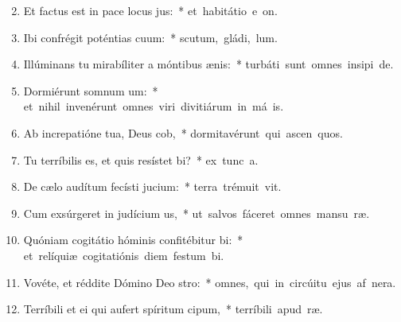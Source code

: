 \begin{flushleft}
\begin{enumerate}[leftmargin=*]
\setcounter{enumi}{1}


\item Et factus est in pace locus jus:~* \mbox{et habitátio e  on.}
\item Ibi confrégit poténtias cuum:~* \mbox{scutum, gládi,  lum.}
\item Illúminans tu mirabíliter a móntibus ænis:~* \mbox{turbáti sunt omnes insipi de.}
\item Dormiérunt somnum um:~* \mbox{et nihil invenérunt omnes viri divitiárum in má is.}
\item Ab increpatióne tua, Deus cob,~* \mbox{dormitavérunt qui ascen quos.}
\item Tu terríbilis es, et quis resístet bi?~* \mbox{ex tunc  a.}
\item De cælo audítum fecísti jucium:~* \mbox{terra trémuit  vit.}
\item Cum exsúrgeret in judícium us,~* \mbox{ut salvos fáceret omnes mansu ræ.}
\item Quóniam cogitátio hóminis confitébitur bi:~* \mbox{et relíquiæ cogitatiónis diem festum  bi.}
\item Vovéte, et réddite Dómino Deo stro:~* \mbox{omnes, qui in circúitu ejus af nera.}
\item Terríbili et ei qui aufert spíritum cipum,~* \mbox{terríbili apud  ræ.}

\end{enumerate}
\end{flushleft}

